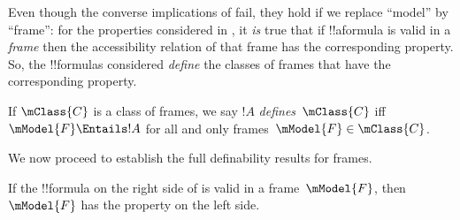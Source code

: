 \documentclass[../../../include/open-logic-section]{subfiles}
\begin{document}


Even though the converse implications of 
fail, they hold if we replace ``model'' by ``frame'': for the
properties considered in , it \emph{is}
true that if !!a{formula} is valid in a \emph{frame} then the
accessibility relation of that frame has the corresponding
property. So, the !!{formula}s considered \emph{define} the classes of
frames that have the corresponding property.

\begin{defn}
  If $\mClass{C}$ is a class of frames, we say $!A$
  \emph{defines}~$\mClass{C}$ iff $\mModel{F} \Entails !A$ for all and only
  frames~$\mModel{F} \in \mClass{C}$.
\end{defn}

We now proceed to establish the full definability results for
frames.

\begin{thm}
If the !!{formula} on the right side of  is valid in a
frame~$\mModel{F}$, then $\mModel{F}$ has the property on the left
side.
\end{thm}
\end{document}

